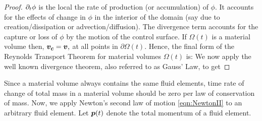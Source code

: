 \begin{proof}
$\partial_{t}\phi$ is the local the rate of production (or accumulation) of $\phi.$ It accounts for the effects of change in $\phi$ in the interior of the domain (say due to creation/dissipation or advection/diffusion). The divergence term accounts for the capture or loss of $\phi$ by the motion of the control surface. If $\Omega(t)$ is a material volume then, $\boldsymbol{v_c}=\boldsymbol{v},$ at all points in $\partial\Omega(t)$. Hence, the final form of the Reynolds Transport Theorem for material volumes $\Omega(t)$ is:
We now apply the well known divergence theorem, also referred to as Gauss' Law,
to get
\end{proof}
Since a material volume always contains the same fluid elements, time rate of change of total mass in a material volume should be zero per law of conservation of mass.
Now, we apply Newton's second law of motion \autoref{eqn:NewtonII} to an arbitrary fluid element. Let $\boldsymbol{p}(t)$ denote the total momentum of a fluid element.
